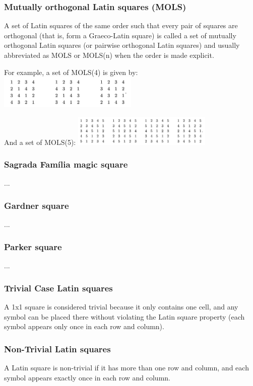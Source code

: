 \documentclass{beamer}
\begin{document}
\begin{frame}
\frametitle{Mutually orthogonal Latin squares (MOLS)}
A set of Latin squares of the same order such that every pair of squares are orthogonal (that is, form a Graeco-Latin square) is called a set of mutually orthogonal Latin squares (or pairwise orthogonal Latin squares) and usually abbreviated as MOLS or MOLS(n) when the order is made explicit.

For example, a set of MOLS(4) is given by:
\includegraphics[width=0.5\textwidth]{img15}

And a set of MOLS(5):
\includegraphics[width=0.5\textwidth]{img16}
\end{frame}

\begin{frame}
\frametitle{Sagrada Família magic square}
...
\end{frame}

\begin{frame}
\frametitle{Gardner square}
...
\end{frame}

\begin{frame}
\frametitle{Parker square}
...
\end{frame}

\begin{frame}
\frametitle{Trivial Case Latin squares}
A 1x1 square is considered trivial because it only contains one cell, and any symbol can be placed there without violating the Latin square property (each symbol appears only once in each row and column).
\end{frame}

\begin{frame}
\frametitle{Non-Trivial Latin squares}
A Latin square is non-trivial if it has more than one row and column, and each symbol appears exactly once in each row and column.
\end{frame}

\end{document}
